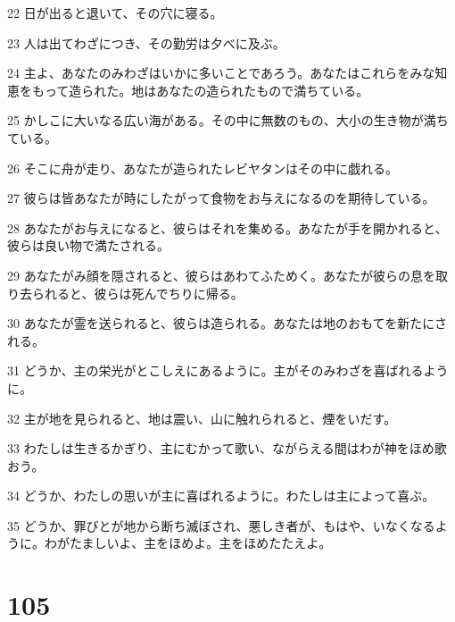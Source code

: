 \par 22 日が出ると退いて、その穴に寝る。
\par 23 人は出てわざにつき、その勤労は夕べに及ぶ。
\par 24 主よ、あなたのみわざはいかに多いことであろう。あなたはこれらをみな知恵をもって造られた。地はあなたの造られたもので満ちている。
\par 25 かしこに大いなる広い海がある。その中に無数のもの、大小の生き物が満ちている。
\par 26 そこに舟が走り、あなたが造られたレビヤタンはその中に戯れる。
\par 27 彼らは皆あなたが時にしたがって食物をお与えになるのを期待している。
\par 28 あなたがお与えになると、彼らはそれを集める。あなたが手を開かれると、彼らは良い物で満たされる。
\par 29 あなたがみ顔を隠されると、彼らはあわてふためく。あなたが彼らの息を取り去られると、彼らは死んでちりに帰る。
\par 30 あなたが霊を送られると、彼らは造られる。あなたは地のおもてを新たにされる。
\par 31 どうか、主の栄光がとこしえにあるように。主がそのみわざを喜ばれるように。
\par 32 主が地を見られると、地は震い、山に触れられると、煙をいだす。
\par 33 わたしは生きるかぎり、主にむかって歌い、ながらえる間はわが神をほめ歌おう。
\par 34 どうか、わたしの思いが主に喜ばれるように。わたしは主によって喜ぶ。
\par 35 どうか、罪びとが地から断ち滅ぼされ、悪しき者が、もはや、いなくなるように。わがたましいよ、主をほめよ。主をほめたたえよ。

\chapter{105}

